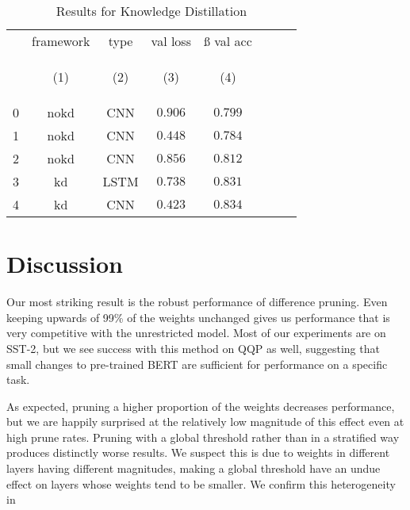 \documentclass[10pt]{article}
\begin{document}



\begin{table}[tbh]
        \caption{Results for Knowledge Distillation}
        \label{tab:kd_results}
        \centering
        \vspace{1em}
        \begin{tabular}{lccccccc}
\toprule
{} &  framework &  type &  val loss &  ß val acc \\
{} & \hypertarget{tabcol:1}{(1)} & \hypertarget{tabcol:2}{(2)} & \hypertarget{tabcol:3}{(3)} & \hypertarget{tabcol:4}{(4)} \\
\midrule
0 &        nokd &   CNN &   $0.906$ &   $0.799$ \\
1 &        nokd &   CNN &   $0.448$ &   $0.784$ \\
2 &        nokd &   CNN &   $0.856$ &   $0.812$ \\
3 &          kd &  LSTM &   $0.738$ &   $0.831$ \\
4 &          kd &   CNN &   $0.423$ &   $0.834$ \\
\bottomrule
\end{tabular}
\label{tbl:kdresults}
\end{table}

\section{Discussion}

Our most striking result is the robust performance of difference pruning. Even
keeping upwards of 99\% of the weights unchanged gives us performance that is
very competitive with the unrestricted model. Most of our experiments are on
SST-2, but we see success with this method on QQP as well, suggesting that
small changes to pre-trained BERT are sufficient for performance on a specific
task. 

As expected, pruning a higher proportion of the weights decreases performance,
but we are happily surprised at the relatively low magnitude of this effect even
at high prune rates. Pruning with a global threshold rather than in a
stratified way produces distinctly worse results. We suspect this is due to
weights in different layers having different magnitudes, making a global
threshold have an undue effect on layers whose weights tend to be smaller. We
confirm this heterogeneity in 
\end{document}
